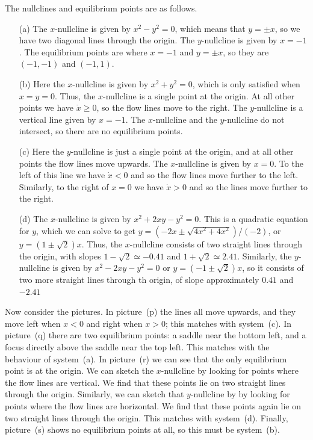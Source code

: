 \documentclass[a4paper]{amsart}
\begin{document}
\begin{solution}
 The nullclines and equilibrium points are as follows.
 \begin{itemize}
  \item[(a)] The $x$-nullcline is given by $x^2-y^2=0$, which means
   that $y=\pm x$, so we have two diagonal lines through the origin.
   The $y$-nullcline is given by $x=-1$.  The equilibrium points are
   where $x=-1$ and $y=\pm x$, so they are $(-1,-1)$ and $(-1,1)$.
  \item[(b)] Here the $x$-nullcline is given by $x^2+y^2=0$, which
   is only satisfied when $x=y=0$.  Thus, the $x$-nullcline is a
   single point at the origin.  At all other points we have
   $\dot{x}\geq 0$, so the flow lines move to the right.  The
   $y$-nullcline is a vertical line given by $x=-1$.  The
   $x$-nullcline and the $y$-nullcline do not intersect, so there are
   no equilibrium points. 
  \item[(c)] Here the $y$-nullcline is just a single point at the
   origin, and at all other points the flow lines move upwards.  The
   $x$-nullcline is given by $x=0$.  To the left of this line we have
   $\dot{x}<0$ and so the flow lines move further to the left.
   Similarly, to the right of $x=0$ we have $\dot{x}>0$ and so the
   lines move further to the right.
  \item[(d)] The $x$-nullcline is given by $x^2+2xy-y^2=0$.  This is a
   quadratic equation for $y$, which we can solve to get
   $y=(-2x\pm\sqrt{4x^2+4x^2})/(-2)$, or $y=(1\pm\sqrt{2})x$.  Thus,
   the $x$-nullcline consists of two straight lines through the origin,
   with slopes $1-\sqrt{2}\simeq -0.41$ and
   $1+\sqrt{2}\simeq 2.41$.  Similarly, the $y$-nullcline is given
   by $x^2-2xy-y^2=0$ or $y=(-1\pm\sqrt{2})x$, so it consists of two
   more straight lines through th origin, of slope approximately
   $0.41$ and $-2.41$
 \end{itemize}
 Now consider the pictures.  In picture~(p) the lines all move
 upwards, and they move left when $x<0$ and right when $x>0$; this
 matches with system~(c).  In picture~(q) there are two equilibrium
 points: a saddle near the bottom left, and a focus directly above the
 saddle near the top left.  This matches with the behaviour of
 system~(a).  In picture~(r) we can see that the only equilibrium
 point is at the origin.  We can sketch the $x$-nullcline by looking
 for points where the flow lines are vertical.  We find that these
 points lie on two straight lines through the origin.  Similarly, we
 can sketch that $y$-nullcline by  by looking for points where the
 flow lines are horizontal.  We find that these points again lie on
 two straight lines through the origin.  This matches with
 system~(d).  Finally, picture~(s) shows no equilibrium points at all,
 so this must be system~(b).
\end{solution}
\end{document}
